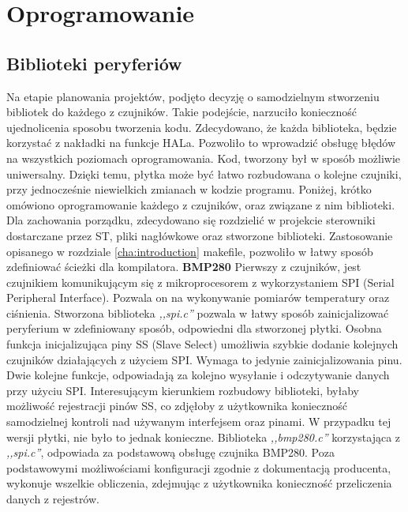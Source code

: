 \section{Oprogramowanie}
\subsection{Biblioteki peryferiów}
Na etapie planowania projektów, podjęto decyzję o samodzielnym stworzeniu bibliotek do każdego z czujników. Takie podejście, narzuciło konieczność ujednolicenia sposobu tworzenia kodu. Zdecydowano, że każda biblioteka, będzie korzystać z nakładki na funkcje HALa. Pozwoliło to wprowadzić obsługę błędów na wszystkich poziomach oprogramowania. Kod, tworzony był w sposób możliwie uniwersalny. Dzięki temu, płytka może być łatwo rozbudowana o kolejne czujniki, przy jednocześnie niewielkich zmianach w kodzie programu. Poniżej, krótko omówiono oprogramowanie każdego z czujników, oraz związane z nim biblioteki. Dla zachowania porządku, zdecydowano się rozdzielić w projekcie sterowniki dostarczane przez ST, pliki nagłówkowe oraz stworzone biblioteki. Zastosowanie opisanego w rozdziale \ref{cha:introduction} makefile, pozwoliło w łatwy sposób zdefiniować ścieżki dla kompilatora.
\newline
\textbf{BMP280}
\newline
Pierwszy z czujników, jest czujnikiem komunikującym się z mikroprocesorem z wykorzystaniem SPI (Serial Peripheral Interface). Pozwala on na wykonywanie pomiarów temperatury oraz ciśnienia. Stworzona biblioteka \textit{,,spi.c''} pozwala w łatwy sposób zainicjalizować peryferium w zdefiniowany sposób, odpowiedni dla stworzonej płytki. Osobna funkcja inicjalizująca piny SS (Slave Select) umożliwia szybkie dodanie kolejnych czujników działających z użyciem SPI. Wymaga to jedynie zainicjalizowania pinu. Dwie kolejne funkcje, odpowiadają za kolejno wysyłanie i odczytywanie danych przy użyciu SPI. Interesującym kierunkiem rozbudowy biblioteki, byłaby możliwość rejestracji pinów SS, co zdjęłoby z użytkownika konieczność samodzielnej kontroli nad używanym interfejsem oraz pinami. W przypadku tej wersji płytki, nie było to jednak konieczne. Biblioteka \textit{,,bmp280.c''} korzystająca z \textit{,,spi.c''}, odpowiada za podstawową obsługę czujnika BMP280. Poza podstawowymi możliwościami konfiguracji zgodnie z dokumentacją producenta, wykonuje wszelkie obliczenia, zdejmując z użytkownika konieczność przeliczenia danych z rejestrów.
\newline
\newline

